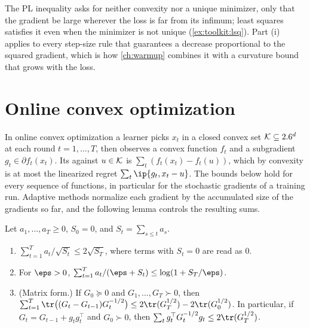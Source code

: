 \begin{refsection}
The PL inequality asks for neither convexity nor a unique minimizer, only that the gradient be large wherever the loss is far from its infimum; least squares satisfies it even when the minimizer is not unique (\cref{ex:toolkit:lsq}). Part (i) applies to every step-size rule that guarantees a decrease proportional to the squared gradient, which is how \cref{ch:warmup} combines it with a curvature bound that grows with the loss.

\section{Online convex optimization}\label{sec:toolkit:online}

In online convex optimization a learner picks $x_t$ in a closed convex set $\mathcal{K}\subseteq2.6^d$ at each round $t=1,\dots,T$, then observes a convex function $f_t$ and a subgradient $g_t\in\partial f_t(x_t)$. Its  against $u\in\mathcal{K}$ is $\sum_t(f_t(x_t)-f_t(u))$, which by convexity is at most the linearized regret $\sum_t\ip{g_t,x_t-u}$. The bounds below hold for every sequence of functions, in particular for the stochastic gradients of a training run. Adaptive methods normalize each gradient by the accumulated size of the gradients so far, and the following lemma controls the resulting sums.

\begin{lemma}\label{lem:toolkit:adagrad}
Let $a_1,\dots,a_T\ge0$, $S_0=0$, and $S_t=\sum_{s\le t}a_s$.
\begin{enumerate}
\item $\sum_{t=1}^Ta_t/\sqrt{S_t}\le2\sqrt{S_T}$, where terms with $S_t=0$ are read as $0$.
\item For $\eps>0$, $\sum_{t=1}^Ta_t/(\eps+S_t)\le\log(1+S_T/\eps)$.
\item (Matrix form.) If $G_0\succeq0$ and $G_1,\dots,G_T\succ0$, then $\sum_{t=1}^T\tr\bigl((G_t-G_{t-1})G_t^{-1/2}\bigr)\le2\tr(G_T^{1/2})-2\tr(G_0^{1/2})$. In particular, if $G_t=G_{t-1}+g_tg_t^\top$ and $G_0\succ0$, then $\sum_tg_t^\top G_t^{-1/2}g_t\le2\tr(G_T^{1/2})$.
\end{enumerate}
\end{lemma}


\end{refsection}

